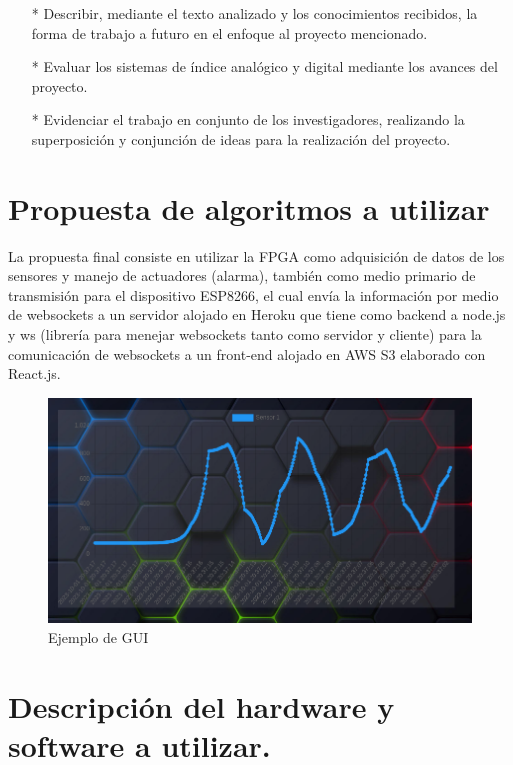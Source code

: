 \documentclass[osajnl,twocolumn,showpacs,superscriptaddress,10pt]{revtex4-1}
\begin{document}
\begin{itemize}
\item[*] Describir, mediante el texto analizado y los conocimientos recibidos, la forma de trabajo a futuro en el enfoque al proyecto mencionado.

\item[*] Evaluar los sistemas de índice analógico y digital mediante los avances del proyecto.

\item[*] Evidenciar el trabajo en conjunto de los investigadores, realizando la superposición y conjunción de ideas para la realización del proyecto.

\end{itemize}

\section{Propuesta de algoritmos a utilizar}
La propuesta final consiste en utilizar la FPGA como adquisición de datos de los sensores y manejo de actuadores (alarma), también como medio primario de transmisión para el dispositivo ESP8266, el cual envía la información por medio de websockets a un servidor alojado en Heroku que tiene como backend a node.js y ws (librería para menejar websockets tanto como servidor y cliente) para la comunicación de websockets a un front-end alojado en AWS S3 elaborado con React.js.


\begin{figure}[H]
    \begin{center}
        \includegraphics[scale=0.3]{images/Screenshot from 2023-10-01 14-37-32.png}
        \caption{Ejemplo de GUI}
    \end{center}
\end{figure}


\section{Descripción del hardware y software a utilizar.}
\end{document}
